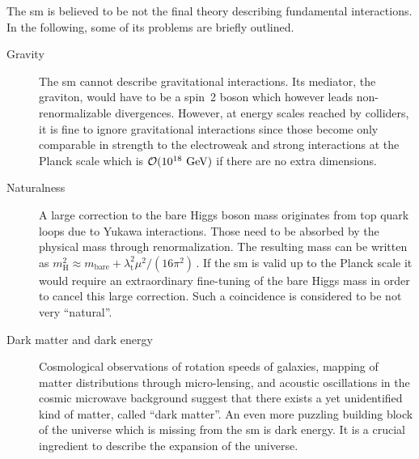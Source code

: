 The \gls{sm} is believed to be not the final theory describing fundamental interactions. In the following, some of its problems are briefly outlined.

\begin{description}
\item[Gravity] The \gls{sm} cannot describe gravitational interactions. Its mediator, the graviton, would have to be a spin~2 boson which however leads non-renormalizable divergences. However, at energy scales reached by colliders, it is fine to ignore gravitational interactions since those become only comparable in strength to the electroweak and strong interactions at the Planck scale which is $\mathcal{O}(10^{18}~\textrm{GeV})$ if there are no extra dimensions.
\item[Naturalness] A large correction to the bare Higgs boson mass originates from top quark loops due to Yukawa interactions. Those need to be absorbed by the physical mass through renormalization. The resulting mass can be written as $m^{2}_\mathrm{H}\approx m_\mathrm{bare}+\lambda_\mathrm{t}^{2}\mu^2/(16\pi^2)\,$. If the \gls{sm} is valid up to the Planck scale it would require an extraordinary fine-tuning of the bare Higgs mass in order to cancel this large correction. Such a coincidence is considered to be not very ``natural''.
\item[Dark matter and dark energy] Cosmological observations of rotation speeds of galaxies, mapping of matter distributions through micro-lensing, and acoustic oscillations in the cosmic microwave background suggest that there exists a yet unidentified kind of matter, called ``dark matter''. An even more puzzling building block of the universe which is missing from the \gls{sm} is dark energy. It is a crucial ingredient to describe the expansion of the universe.

\end{description}

